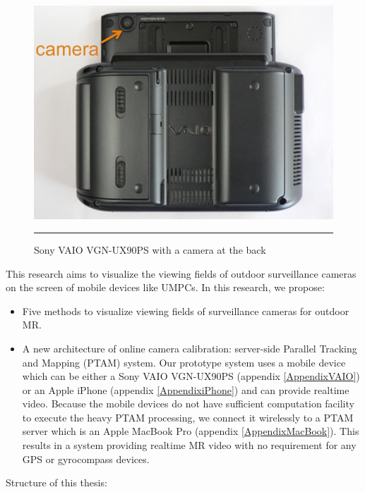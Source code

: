\begin{figure}[htbp]
	\centering
	\includegraphics{./Primitives/vaio_back.png}
	\rule{35em}{0.5pt}
	\caption[Sony VAIO VGN-UX90PS with a camera at the back]{Sony VAIO VGN-UX90PS with a camera at the back}
	\label{fig:VAIOBack}
\end{figure}

This research aims to visualize the viewing fields of outdoor surveillance cameras on the screen of mobile devices like UMPCs. In this research, we propose:

\begin{itemize}
	\item Five methods to visualize viewing fields of surveillance cameras for outdoor MR.
	\item A new architecture of online camera calibration: server-side Parallel Tracking and Mapping (PTAM) \cite{Reference12} system. Our prototype system uses a mobile device which can be either a Sony VAIO VGN-UX90PS (appendix \ref{AppendixVAIO}) or an Apple iPhone (appendix \ref{AppendixiPhone}) and can provide realtime video. Because the mobile devices do not have sufficient computation facility to execute the heavy PTAM processing, we connect it wirelessly to a PTAM server which is an Apple MacBook Pro (appendix \ref{AppendixMacBook}). This results in a system providing realtime MR video with no requirement for any GPS or gyrocompass devices.
\end{itemize}

Structure of this thesis:

